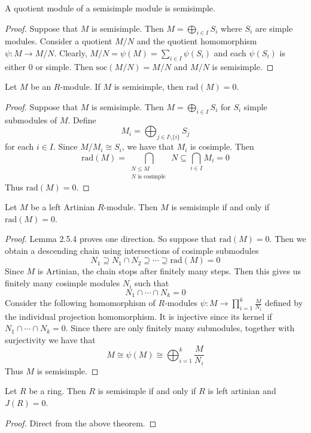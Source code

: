 \documentclass[a4paper]{article}
\begin{document}
\begin{crl}{}{} A quotient module of a semisimple module is semisimple. \tcbline
\begin{proof}
Suppose that $M$ is semisimple. Then $M=\bigoplus_{i\in I}S_i$ where $S_i$ are simple modules. Consider a quotient $M/N$ and the quotient homomorphism $\psi:M\to M/N$. Clearly, $M/N=\psi(M)=\sum_{i\in I}\psi(S_i)$ and each $\psi(S_i)$ is either $0$ or simple. Then $\text{soc}(M/N)=M/N$ and $M/N$ is semisimple. 
\end{proof}
\end{crl}

\begin{lmm}{}{} Let $M$ be an $R$-module. If $M$ is semisimple, then $\text{rad}(M)=0$. \tcbline
\begin{proof}
Suppose that $M$ is semisimple. Then $M=\bigoplus_{i\in I}S_i$ for $S_i$ simple submodules of $M$. Define $$M_i=\bigoplus_{j\in I\setminus\{i\}}S_j$$ for each $i\in I$.  Since $M/M_i\cong S_i$, we have that $M_i$ is cosimple. Then $$\text{rad}(M)=\bigcap_{\substack{N\leq M\\N\text{ is cosimple }}}N\subseteq\bigcap_{i\in I}M_i=0$$ Thus $\text{rad}(M)=0$. 
\end{proof}
\end{lmm}

\begin{thm}{}{} Let $M$ be a left Artinian $R$-module. Then $M$ is semisimple if and only if $\text{rad}(M)=0$. \tcbline
\begin{proof}
Lemma 2.5.4 proves one direction. So suppose that $\text{rad}(M)=0$. Then we obtain a descending chain using intersections of cosimple submodules $$N_1\supseteq N_1\cap N_2\supseteq\cdots\supseteq\text{rad}(M)=0$$ Since $M$ is Artinian, the chain stops after finitely many steps. Then this gives us finitely many cosimple modules $N_i$ such that $$N_1\cap\cdots\cap N_k=0$$ Consider the following homomorphism of $R$-modules $\psi:M\to\prod_{i=1}^k\frac{M}{N_i}$ defined by the individual projection homomorphism. It is injective since its kernel if $N_1\cap\cdots\cap N_k=0$. Since there are only finitely many submodules, together with surjectivity we have that $$M\cong\psi(M)\cong\bigoplus_{i=1}^k\frac{M}{N_i}$$ Thus $M$ is semisimple. 
\end{proof}
\end{thm}

\begin{crl}{}{} Let $R$ be a ring. Then $R$ is semisimple if and only if $R$ is left artinian and $J(R)=0$. \tcbline
\begin{proof}
Direct from the above theorem. 
\end{proof}
\end{crl}
\end{document}
